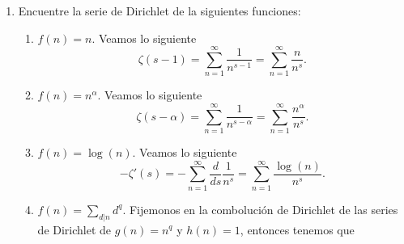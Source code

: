 \documentclass[letterpaper]{article}
\newcommand{\pars}[1]{\left( #1 \right) }
\newcommand{\1}{\mathbbm{1}}
\begin{document}
\begin{enumerate}
\begin{enumerate}
\begin{proof}
				\[n = |\bigcup_{d\mid n} S_d| = \sum_{d\mid n} \varphi\left(\frac{n}{d}\right)\]
				
				Ahora como $d\mid n$, entonces $\frac{n}{d}\mid n$, es decir el conjunto  $\{\frac{n}{d} : n\mid n\}$ son todos los divisores de $n$. Por lo que concluimos que
				
				\[n = \sum_{d\mid n} \varphi(d)\]
				
			\end{proof}

			\item Muestre que $\varphi(n)$ es multiplicativa.
			
			\begin{proof}
				Por inversión de Moebius y por el inciso anterior tenemos que

				\[\varphi(n) = \sum_{d|n} \mu\pars{\frac{n}{d}}d,\]

				es decir $\varphi(n)$ es la combolución de Dirichlet de la funciones $\mu$ e identidad. Luego evaluando en $nm$ donde $(n,m)=1$ obtenemos

				\[\varphi(nm) = \sum{d|nm} \mu\pars{\frac{nm}{d}}d,\]

				ahora como $(n,m) = 1$ entonces para todo $d|nm$ se cumple que $d = d_1d_2$ donde $d_1|n$ y $d_2|m$, por lo tanto 

				\begin{align*}
					\varphi(nm) &= \sum_{d_1|n,d_2|m} \mu\pars{\frac{nm}{d_1d_2}}d_1d_2\\
					&= \sum_{d_1|n,d_2|m} \mu\pars{\frac{n}{d_1}}d_1 \mu\pars{\frac{nm}{d_1d_2}}d_2\\
					&= \pars{\sum_{d_1|n} \mu\pars{\frac{n}{d_1}}d_1}\pars{\sum_{d_2|m} \mu\pars{\frac{nm}{d_1d_2}}d_2}\\
					&= \varphi(n)\varphi(m).
				\end{align*}
			\end{proof}

			\item Encuentre la serie de Dirichlet de la función $\varphi(n)$ en término de la función zeta de Riemann $\zeta$.
		\end{enumerate}
		\item Encuentre la serie de Dirichlet de la siguientes funciones:
		\begin{enumerate}
			\item $f(n) = n$.
			Veamos lo siguiente
			\[\zeta\pars{s-1} = \sum_{n=1}^{\infty} \frac{1}{n^{s-1}} = \sum_{n=1}^{\infty} \frac{n}{n^{s}}.\]
			\item $f(n) = n^{\alpha}$.
			Veamos lo siguiente
			\[\zeta\pars{s-\alpha} = \sum_{n=1}^{\infty} \frac{1}{n^{s-\alpha}} = \sum_{n=1}^{\infty} \frac{n^{\alpha}}{n^{s}}.\]
			\item $f(n) = \log(n)$.
			Veamos lo siguiente
			\[-\zeta'\pars{s} = -\sum_{n=1}^{\infty} \frac{d}{ds}\frac{1}{n^{s}} = \sum_{n=1}^{\infty} \frac{\log(n)}{n^{s}}.\]
			\item $f(n) = \sum_{d|n} d^q$.
			Fijemonos en la combolución de Dirichlet de las series de Dirichlet de $g(n) = n^q$ y $h(n) = 1$, entonces tenemos que


\end{enumerate}
\end{enumerate}
\end{document}
